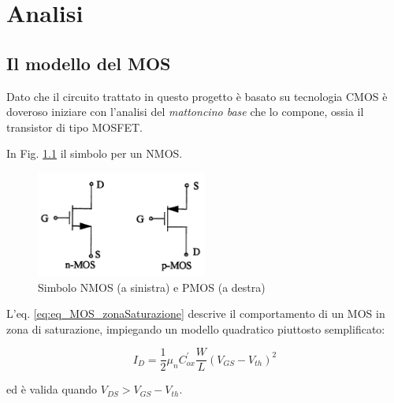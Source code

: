 
\chapter{Analisi} %
\label{Chapter2}

\section{Il modello del MOS}
\label{sec:sec_mos}

Dato che il circuito trattato in questo progetto è basato su tecnologia CMOS è doveroso iniziare con l'analisi del \textit{mattoncino base} che lo compone, ossia il transistor di tipo MOSFET.

In Fig. \ref{fig:simboliMos} il simbolo per un NMOS.

\begin{figure}[hbt!]
	\centering
	\includegraphics[width=0.5\textwidth]{figure/simboliMos.png}
	\caption{Simbolo NMOS (a sinistra) e PMOS (a destra)}
	\label{fig:simboliMos}
\end{figure}

L'eq. \ref{eq:eq_MOS_zonaSaturazione} descrive il comportamento di un MOS in zona di saturazione, impiegando un modello quadratico piuttosto semplificato:

\begin{equation}
	I_{D} = \frac{1}{2} \mu _{n} C^{'}_{ox} \frac{W}{L} (V_{GS}-V_{th})^2
	\label{eq:eq_MOS_zonaSaturazione}
\end{equation}

ed è valida quando $V_{DS} > V_{GS}-V_{th}$.

